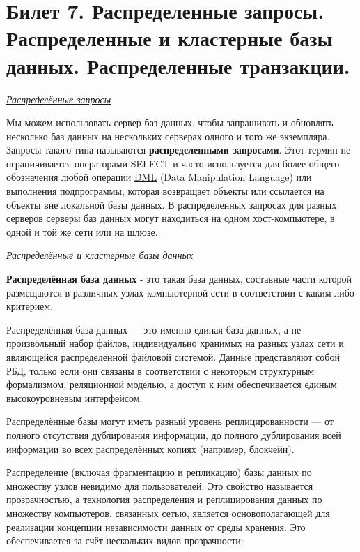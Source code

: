 \newpage
\section {Билет 7. Распределенные запросы. Распределенные и кластерные базы данных. Распределенные транзакции.}

\begin{center}
	\textit{\underline{Распределённые запросы}}
\end{center}

Мы можем использовать сервер баз данных, чтобы запрашивать и обновлять несколько баз данных на нескольких серверах одного и того же экземпляра. Запросы такого типа называются \textbf{распределенными запросами}. Этот термин не ограничивается операторами SELECT и часто используется для более общего обозначения любой операции \hyperlink{DML_label}{DML} (Data Manipulation Language) или выполнения подпрограммы, которая возвращает объекты или ссылается на объекты вне локальной базы данных.
В распределенных запросах для разных серверов серверы баз данных могут находиться на одном хост-компьютере, в одной и той же сети или на шлюзе.

\begin{center}
	\textit{\underline{Распределённые и кластерные базы данных}}
\end{center}

\textbf{Распределённая база данных} - это такая база данных, составные части которой размещаются в различных узлах компьютерной сети в соответствии с каким-либо критерием.

Распределённая база данных — это именно единая база данных, а не произвольный набор файлов, индивидуально хранимых на разных узлах сети и являющейся распределенной файловой системой. Данные представляют собой РБД, только если они связаны в соответствии с некоторым структурным формализмом, реляционной моделью, а доступ к ним обеспечивается единым высокоуровневым интерфейсом.

Распределённые базы могут иметь разный уровень реплицированности — от полного отсутствия дублирования информации, до полного дублирования всей информации во всех распределённых копиях (например, блокчейн).

Распределение (включая фрагментацию и репликацию) базы данных по множеству узлов невидимо для пользователей. Это свойство называется прозрачностью, а технология распределения и реплицирования данных по множеству компьютеров, связанных сетью, является основополагающей для реализации концепции независимости данных от среды хранения. Это обеспечивается за счёт нескольких видов прозрачности:

